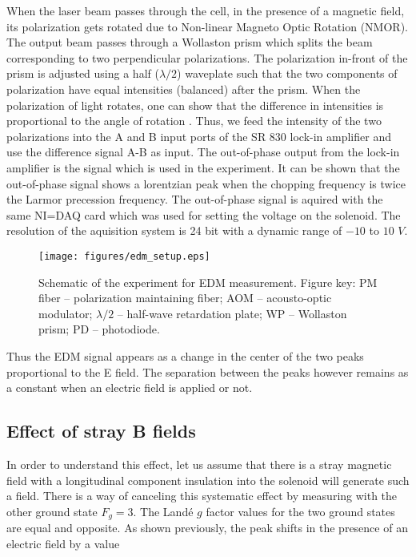 \begin{enumerate}
When the laser beam passes through the cell, in the presence of a magnetic field, its polarization gets rotated due to Non-linear Magneto Optic Rotation (NMOR). The output beam passes through a Wollaston prism which splits the beam corresponding to two perpendicular polarizations. The polarization in-front of the prism is adjusted using a half ($\lambda/2$) waveplate such that the two components of polarization have equal intensities (balanced) after the prism. When the polarization of light rotates, one can show that the difference in intensities is proportional to the angle of rotation \cite{BGK02}. Thus, we feed the intensity of the two polarizations into the A and B input ports of the SR 830 lock-in amplifier and use the difference signal A-B as input. The out-of-phase output from the lock-in amplifier is the signal which is used in the experiment. It can be shown that the out-of-phase signal shows a lorentzian peak when the chopping frequency is twice the Larmor precession frequency. The out-of-phase signal is aquired with the same NI=DAQ card which was used for setting the voltage on the solenoid. The resolution of the aquisition system is 24 bit with a dynamic range of $-10$ to $10$ $V$.



\begin{figure}[ht]
\centering
\texttt{[image: figures/edm\_setup.eps]}
\caption{Schematic of the experiment for EDM measurement. Figure key: PM fiber -- polarization maintaining fiber; AOM -- acousto-optic modulator; $\lambda/2 $ -- half-wave retardation plate; WP -- Wollaston prism; PD -- photodiode.}
\label{fig:edm_setup}
\end{figure}

Thus the EDM signal appears as a change in the center of the two peaks proportional to the E field. The separation between the peaks however remains as a constant when an electric field is applied or not.

\subsection{Effect of stray B fields}
In order to understand this effect, let us assume that there is a stray magnetic field with a longitudinal component insulation into the solenoid will generate such a field. There is a way of canceling this systematic effect by measuring with the other ground state $F_g=3$. The Land\'e $g$ factor values for the two ground states are equal and opposite. As shown previously, the peak shifts in the presence of an electric field by a value


\end{enumerate}
